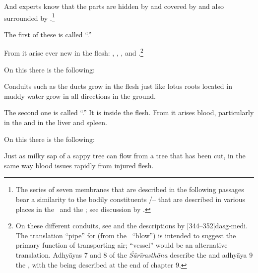 \begin{translation}
\item[7]
 
 \begin{sloka}
And experts know that the  parts are hidden by
 and covered by  and also
surrounded by .\footnote{The series of seven  
membranes that are described in the following passages bear a similarity to the 
bodily constituents /-- that are described in 
various places in the \SS\ and the \CS; see discussion by \citet{maas-2008}.}
\end{sloka}
 
 \item[8]
 
The first of these is called “.” 
 
From it arise ever new  in the flesh:
, , , and
.\footnote{On these different conduits, see
    \cites[404--406]{wuja-2022}[xlvi--xlvii]{wuja-2003}[26--28]{ray-1980} and 
    the descriptions by 
    [344--352]{dasg-medi}. The translation
    “pipe” for  (from the \root\, “blow”) is
    intended to suggest the primary function of transporting air;
    “vessel” would be an alternative translation. Adhyāyas 
    7 and 8 of the \emph{Śārīrasthāna} describe the  and adhyāya 9 
    the , with the  being described at the end of 
    chapter 9.}
  
\item[9]

On this there is the following:

\begin{sloka}
Conduits such as the ducts grow in the flesh just like lotus roots located in 
muddy water grow in all directions in the ground.
\end{sloka}

 \item[10]
 
The second one is called “.” It is inside the 
flesh. 
From it arises blood, particularly in the  and in the
liver and spleen.
 
\item[11]

On this there is the following:

\begin{sloka}
    Just as milky sap of a sappy tree can flow from a tree that has been cut, 
    in the same way blood issues rapidly from injured flesh.
\end{sloka}


\end{translation}
